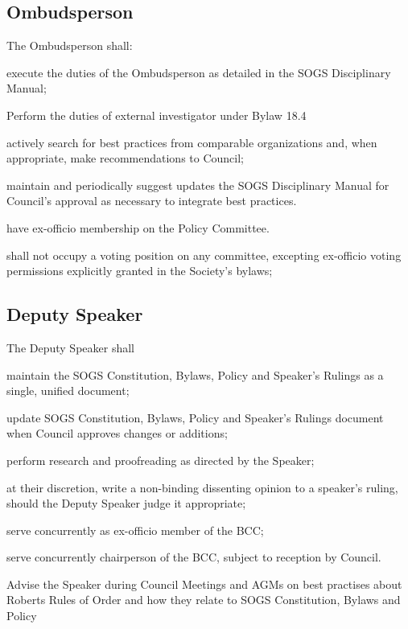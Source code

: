 \subsection{Ombudsperson}
The Ombudsperson shall:
\begin{longenum}[ label*=\thesubsection.\arabic*., align=left]


\item execute the duties of the Ombudsperson as detailed in the SOGS Disciplinary Manual; 
\item Perform the duties of external investigator under Bylaw 18.4
\item actively search for best practices from comparable organizations and, when appropriate, make recommendations to Council;
\item maintain and periodically suggest updates the SOGS Disciplinary Manual for Council's approval
as necessary to integrate best practices.
\item have ex-officio membership on the Policy Committee.
\item shall not occupy a voting position on any committee, excepting ex-officio voting permissions explicitly granted in the Society’s bylaws;
\end{longenum}
\subsection{Deputy Speaker}
The Deputy Speaker shall
\begin{longenum}[ label*=\thesubsection.\arabic*., align=left]
\item maintain the SOGS Constitution, Bylaws, Policy and Speaker's Rulings as a single, unified document;
\item update SOGS Constitution, Bylaws, Policy and Speaker's Rulings document when Council approves changes or additions;
\item perform research and proofreading as directed by the Speaker;
\item at their discretion, write a non-binding dissenting opinion to a speaker's ruling, should the Deputy Speaker judge it appropriate;
\item serve concurrently as ex-officio member of the BCC;
\item serve concurrently chairperson of the BCC, subject to reception by Council.
\item Advise the Speaker during Council Meetings and AGMs on best practises about Roberts Rules
of Order and how they relate to SOGS Constitution, Bylaws and Policy
\end{longenum}

